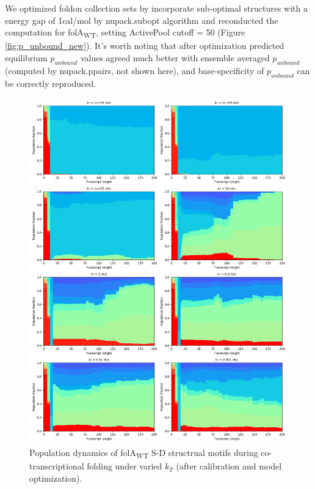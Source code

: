 \documentclass[11pt, a4paper]{article}
\begin{document}
 We optimized foldon collection sets by incorporate sub-optimal structures with a energy gap of 1cal/mol by nupack.subopt algorithm and reconducted the computation for folA\textsubscript{WT}, setting ActivePool cutoff = 50 (Figure \ref{fig:p_unbound_new}). It's worth noting that after optimization predicted equilibrium $p_{unbound}$ values agreed much better with ensemble averaged $p_{unbound}$ (computed by nupack.ppairs, not shown here), and base-specificity of $p_{unbound}$ can be correctly reproduced.

\begin{figure}[htp]
 \centering
 \includegraphics[width=\textwidth]{folA_local_population_evolution_summary_bin1}
 \caption[Population dynamics]{\small Population dynamics of folA\textsubscript{WT} S-D structrual motifs during co-transcriptional folding under varied $k_T$ (after calibration and model optimization).}
 \label{fig:populations_revised}
\end{figure}
\end{document}
